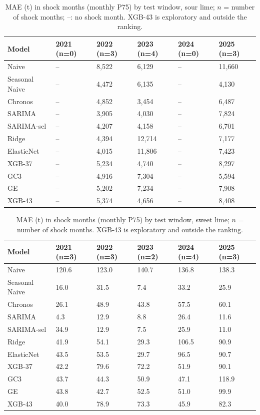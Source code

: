 \begin{table}[H]
\centering
\small
\caption{MAE (t) in shock months (monthly P75) by test window, sour lime; $n$ = number of shock months; --: no shock month. XGB-43 is exploratory and outside the ranking.}
\label{tab:T05_MAE_shock_P75_por_ventana_sutil}
\begin{tabular}{llllll}
\toprule
Model & 2021 (n=0) & 2022 (n=3) & 2023 (n=4) & 2024 (n=0) & 2025 (n=3) \\
\midrule
Naive & -- & 8,522 & 6,129 & -- & 11,660 \\
Seasonal Naive & -- & 4,472 & 6,135 & -- & 4,130 \\
Chronos & -- & 4,852 & 3,454 & -- & 6,487 \\
SARIMA & -- & 3,905 & 4,030 & -- & 7,824 \\
SARIMA-sel & -- & 4,207 & 4,158 & -- & 6,701 \\
Ridge & -- & 4,394 & 12,714 & -- & 7,177 \\
ElasticNet & -- & 4,015 & 11,806 & -- & 7,423 \\
XGB-37 & -- & 5,234 & 4,740 & -- & 8,297 \\
GC3 & -- & 4,916 & 7,304 & -- & 5,594 \\
GE & -- & 5,202 & 7,234 & -- & 7,908 \\
XGB-43 & -- & 5,374 & 4,656 & -- & 8,408 \\
\bottomrule
\end{tabular}
\end{table}

\begin{table}[H]
\centering
\small
\caption{MAE (t) in shock months (monthly P75) by test window, sweet lime; $n$ = number of shock months. XGB-43 is exploratory and outside the ranking.}
\label{tab:T05_MAE_shock_P75_por_ventana_dulce}
\begin{tabular}{llllll}
\toprule
Model & 2021 (n=3) & 2022 (n=3) & 2023 (n=2) & 2024 (n=4) & 2025 (n=3) \\
\midrule
Naive & 120.6 & 123.0 & 140.7 & 136.8 & 138.3 \\
Seasonal Naive & 16.0 & 31.5 & 7.4 & 33.2 & 25.9 \\
Chronos & 26.1 & 48.9 & 43.8 & 57.5 & 60.1 \\
SARIMA & 4.3 & 12.9 & 8.8 & 26.4 & 11.6 \\
SARIMA-sel & 34.9 & 12.9 & 7.5 & 25.9 & 11.0 \\
Ridge & 41.9 & 54.1 & 29.3 & 106.5 & 90.9 \\
ElasticNet & 43.5 & 53.5 & 29.7 & 96.5 & 90.7 \\
XGB-37 & 42.2 & 79.6 & 72.2 & 51.9 & 90.1 \\
GC3 & 43.7 & 44.3 & 50.9 & 47.1 & 118.9 \\
GE & 43.8 & 42.7 & 52.5 & 51.0 & 99.9 \\
XGB-43 & 40.0 & 78.9 & 73.3 & 45.9 & 82.3 \\
\bottomrule
\end{tabular}
\end{table}

